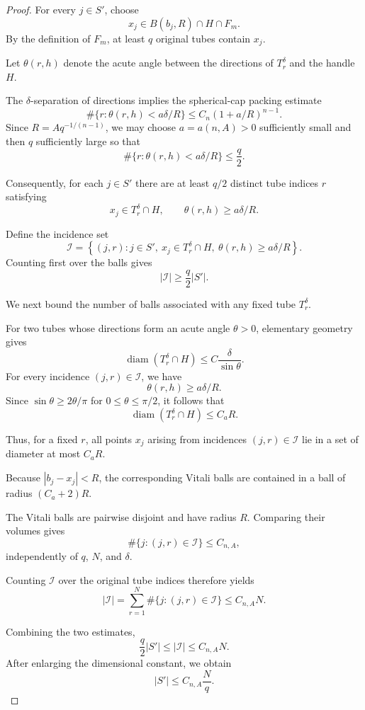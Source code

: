 \documentclass[11pt, letterpaper]{nyjm}
\begin{document}
\begin{proof}
	For every $j\in S'$, choose
	\[
	x_j\in B(b_j,R)\cap H\cap F_m.
	\]
	By the definition of $F_m$, at least $q$
	original tubes contain $x_j$.
	
	Let $\theta(r,h)$ denote the acute angle
	between the directions of $T_r^\delta$
	and the handle $H$.
	
	The $\delta$-separation of directions implies
	the spherical-cap packing estimate
	\[
	\#\{r:\theta(r,h)<a\delta/R\}
	\leq C_n(1+a/R)^{n-1}.
	\]
	Since $R=Aq^{-1/(n-1)}$, we may choose
	$a=a(n,A)>0$ sufficiently small and then
	$q$ sufficiently large so that
	\[
	\#\{r:\theta(r,h)<a\delta/R\}
	\leq \frac q2.
	\]
	
	Consequently, for each $j\in S'$ there are
	at least $q/2$ distinct tube indices $r$
	satisfying
	\[
	x_j\in T_r^\delta\cap H,
	\qquad
	\theta(r,h)\geq a\delta/R.
	\]
	
	Define the incidence set
	\[
	\mathcal I=
	\left\{(j,r):
	j\in S',\
	x_j\in T_r^\delta\cap H,\
	\theta(r,h)\geq a\delta/R
	\right\}.
	\]
	Counting first over the balls gives
	\[
	|\mathcal I|\geq \frac q2|S'|.
	\]
	
	We next bound the number of balls associated
	with any fixed tube $T_r^\delta$.
	
	For two tubes whose directions form an acute
	angle $\theta>0$, elementary geometry gives
	\[
	\operatorname{diam}
	(T_r^\delta\cap H)
	\leq C\frac{\delta}{\sin\theta}.
	\]
	For every incidence $(j,r)\in\mathcal I$,
	we have
	\[
	\theta(r,h)\geq a\delta/R.
	\]
	Since $\sin\theta\geq 2\theta/\pi$ for
	$0\leq\theta\leq\pi/2$, it follows that
	\[
	\operatorname{diam}
	(T_r^\delta\cap H)
	\leq C_aR.
	\]
	
	Thus, for a fixed $r$, all points $x_j$
	arising from incidences $(j,r)\in\mathcal I$
	lie in a set of diameter at most $C_aR$.
	
	Because $|b_j-x_j|<R$, the corresponding
	Vitali balls are contained in a ball of
	radius $(C_a+2)R$.
	
	The Vitali balls are pairwise disjoint
	and have radius $R$. Comparing their
	volumes gives
	\[
	\#\{j:(j,r)\in\mathcal I\}\leq C_{n,A},
	\]
	independently of $q$, $N$, and $\delta$.
	
	Counting $\mathcal I$ over the original
	tube indices therefore yields
	\[
	|\mathcal I|
	=\sum_{r=1}^N
	\#\{j:(j,r)\in\mathcal I\}
	\leq C_{n,A}N.
	\]
	
	Combining the two estimates,
	\[
	\frac q2|S'|
	\leq |\mathcal I|
	\leq C_{n,A}N.
	\]
	After enlarging the dimensional constant,
	we obtain
	\[
	\boxed{|S'|\leq C_{n,A}\frac{N}{q}.}
	\]
\end{proof}
\end{document}

